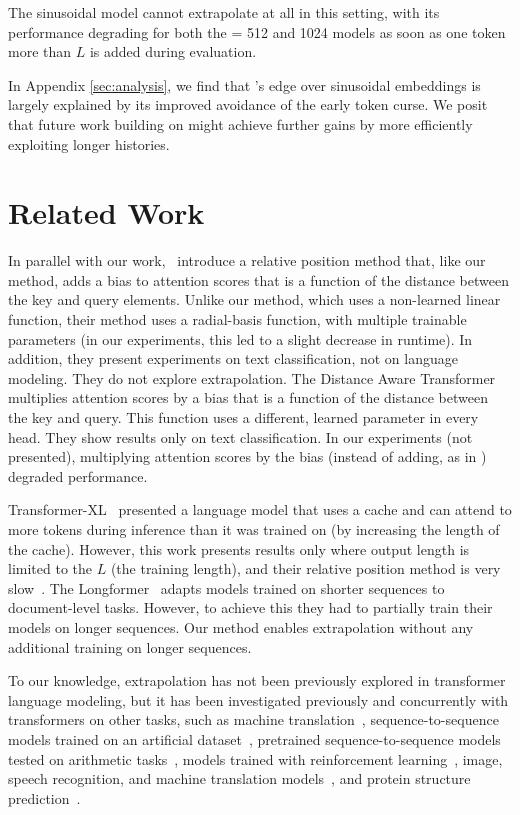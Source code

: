 The sinusoidal model cannot extrapolate at all in this setting, with its performance degrading for both the \lt = 512 and 1024 models as soon as one token more than $L$ is added during evaluation. 

In Appendix \ref{sec:analysis}, we find that \al's  edge over sinusoidal embeddings is largely explained by its improved avoidance of the early token curse.  We posit  that future work building on \al might achieve further gains by more efficiently  exploiting longer histories.

\section{Related Work}
In parallel with our work,~\citet{wennberg2021case} introduce a relative position method that, like our method, adds a bias to attention scores that is a function of the distance between the key and query elements. 
Unlike our \al method, which uses a  non-learned linear function, their method uses a radial-basis function, with multiple trainable parameters (in our experiments, this led to a slight decrease in runtime). 
In addition, they present experiments on text classification, not on language modeling.  They do not explore extrapolation.
The Distance Aware Transformer~\citep{da-transformer} multiplies attention scores by a bias that is a function of the distance between the key and query. This function uses a different, learned parameter in every head. They show results only on text classification. In our experiments (not presented), multiplying attention scores by the bias (instead of adding, as in \al) degraded performance. 

Transformer-XL~\citep{transformer-xl}  presented a language model that uses a cache and can attend to more tokens during inference than it was trained on (by increasing the length of the cache). However, this work presents results only where output length is limited to the $L$ (the training length), and their relative position method is very slow~\citep{shortformer}. 
The Longformer~\citep{longformer} adapts models trained on shorter sequences to document-level tasks. However, to achieve this they had to partially train their models on longer sequences. Our \al method enables extrapolation without any additional training on longer sequences. 

To our knowledge, extrapolation has not been previously explored in transformer language modeling, but it has been investigated previously and concurrently with transformers on other tasks, such as %
machine translation~\citep{rosendahl2019:pos_enc, neishi-yoshinaga-2019-relation, newman2020extrapolation, Kiyono2021SHAPESA}, sequence-to-sequence models trained on an artificial dataset~\citep{Hupkes2020}, pretrained sequence-to-sequence models tested on arithmetic tasks~\citep[Appendix C]{Nogueira2021InvestigatingTL}, models trained with reinforcement learning~\citep{lampinen2021towards}, image, speech recognition, and machine translation models~\citep{likhomanenko2021cape}, and protein structure prediction~\citep[Appendix 1.5]{Jumper2021HighlyAP}. 

